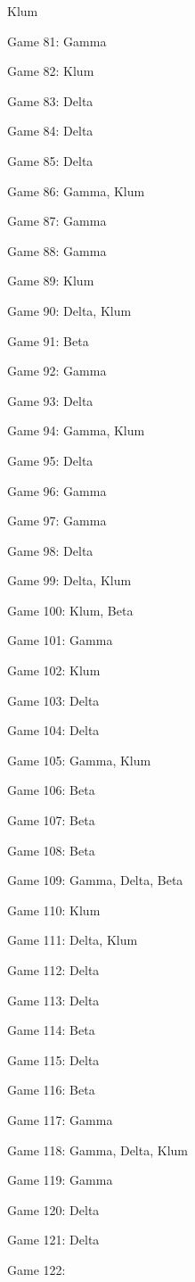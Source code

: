 \documentclass{article}
\begin{document}
\begin{multicols}{3}
\begin{compactitem}
Klum
\item Game 81:
Gamma
\item Game 82:
Klum
\item Game 83:
Delta
\item Game 84:
Delta
\item Game 85:
Delta
\item Game 86:
Gamma, Klum
\item Game 87:
Gamma
\item Game 88:
Gamma
\item Game 89:
Klum
\item Game 90:
Delta, Klum
\item Game 91:
Beta
\item Game 92:
Gamma
\item Game 93:
Delta
\item Game 94:
Gamma, Klum
\item Game 95:
Delta
\item Game 96:
Gamma
\item Game 97:
Gamma
\item Game 98:
Delta
\item Game 99:
Delta, Klum
\item Game 100:
Klum, Beta
\item Game 101:
Gamma
\item Game 102:
Klum
\item Game 103:
Delta
\item Game 104:
Delta
\item Game 105:
Gamma, Klum
\item Game 106:
Beta
\item Game 107:
Beta
\item Game 108:
Beta
\item Game 109:
Gamma, Delta, Beta
\item Game 110:
Klum
\item Game 111:
Delta, Klum
\item Game 112:
Delta
\item Game 113:
Delta
\item Game 114:
Beta
\item Game 115:
Delta
\item Game 116:
Beta
\item Game 117:
Gamma
\item Game 118:
Gamma, Delta, Klum
\item Game 119:
Gamma
\item Game 120:
Delta
\item Game 121:
Delta
\item Game 122:

\end{compactitem}
\end{multicols}
\end{document}
